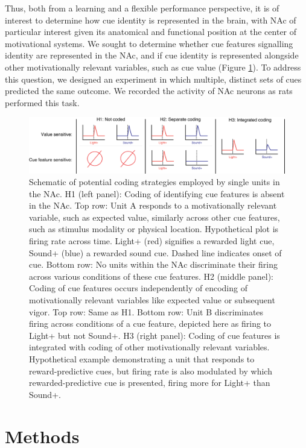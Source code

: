 \documentclass[11pt]{article}
\begin{document}
Thus, both from a learning and a flexible performance perspective, it is of interest to determine how cue identity is represented in the brain, with NAc of particular interest given its anatomical and functional position at the center of motivational systems. We sought to determine whether cue features signalling identity are represented in the NAc, and if cue identity is represented alongside other motivationally relevant variables, such as cue value (Figure \ref{fig:schematic}). To address this question, we designed an experiment in which multiple, distinct sets of cues predicted the same outcome. We recorded the activity of NAc neurons as rats performed this task. 

\begin{figure}[h]
\centering
\includegraphics[width=\textwidth]{Fig 1 - Schematic neural.png}
\caption{Schematic of potential coding strategies employed by single units in the NAc. H1 (left panel): Coding of identifying cue features is absent in the NAc. Top row: Unit A responds to a motivationally relevant variable, such as expected value, similarly across other cue features, such as stimulus modality or physical location. Hypothetical plot is firing rate across time. Light+ (red) signifies a rewarded light cue, Sound+ (blue) a rewarded sound cue. Dashed line indicates onset of cue. Bottom row: No units within the NAc discriminate their firing across various conditions of these cue features. H2 (middle panel): Coding of cue features occurs independently of encoding of motivationally relevant variables like expected value or subsequent vigor. Top row: Same as H1. Bottom row: Unit B discriminates firing across conditions of a cue feature, depicted here as firing to Light+ but not Sound+. H3 (right panel): Coding of cue features is integrated with coding of other motivationally relevant variables. Hypothetical example demonstrating a unit that responds to reward-predictive cues, but firing rate is also modulated by which rewarded-predictive cue is presented, firing more for Light+ than Sound+.}
\label{fig:schematic}
\end{figure}

\section*{Methods}
\end{document}
